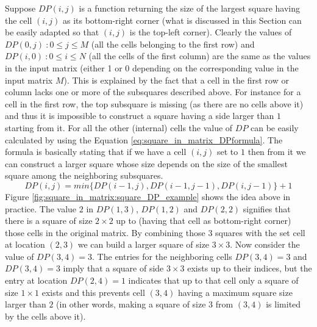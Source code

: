 Suppose $DP(i,j)$ is a function returning the size of the largest square having the cell $(i,j)$ as
its bottom-right corner (what is discussed in this Section can be easily adapted so that $(i,j)$ is the
top-left corner). Clearly the values of $DP(0,j) \: : 0 \leq j \leq M$ (all the cells belonging to
the first row) and $DP(i,0) \: : 0 \leq i \leq N$ (all the cells of the first column) are the same
as the values in the input matrix (either 1 or 0 depending on the corresponding value in the
input matrix $M$). This is explained by the fact that a cell in the first row or column lacks one or
more of the subsquares described above. For instance for a cell in the first row, the top subsquare
is missing (as there are no cells above it) and thus it is impossible to construct a square having a
side larger than $1$ starting from it. For all the other (internal) cells the value of $DP$ can be
easily calculated by using the Equation \ref{eq:square_in_matrix_DPformula}. The formula is
basically stating that if we have a cell $(i,j)$ set to $1$ then from it we can construct a larger
square whose size depends on the size of the smallest square among the neighboring subsquares.
\begin{equation}
	\label{eq:square_in_matrix_DPformula}
	DP(i,j) = min\{DP(i-1,j),DP(i-1,j-1), DP(i,j-1)\} +1
\end{equation}
Figure \ref{fig:square_in_matrix:square_DP_example} shows the idea above in practice. The value $2$
in $DP(1,3)$, $DP(1,2)$ and $DP(2,2)$ signifies that there is a square of size $2\times 2$ up to
(having that cell as bottom-right corner) those cells in the original matrix. By combining those $3$
squares with the set cell at location $(2,3)$ we can build a larger square of size $3\times 3$. Now
consider the value of $DP(3,4)=3$. The entries for the neighboring cells $DP(3,4)=3$ and $DP(3,4)=3$
imply that a square of side $3\times 3$ exists up to their indices, but the entry at location
$DP(2,4)=1$ indicates that up to that cell only a square of size $1\times 1$ exists and this
prevents cell $(3,4)$ having  a maximum square size larger than $2$ (in other words, making a square
of size $3$ from $(3,4)$ is limited by the cells above it).

